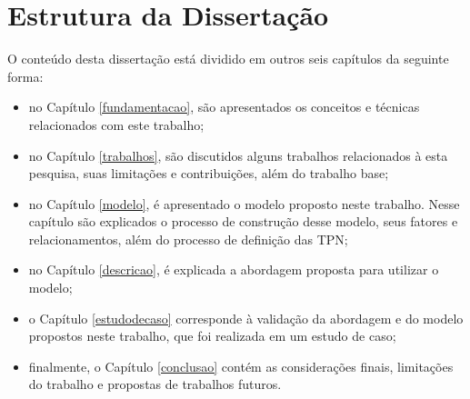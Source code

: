 \section{Estrutura da Dissertação}
\label{introducao:estrutura}

O conteúdo desta dissertação está dividido em outros seis capítulos da seguinte forma:

\begin{itemize}
  \item no Capítulo \ref{fundamentacao}, são apresentados os conceitos e técnicas relacionados com este trabalho;
  \item no Capítulo \ref{trabalhos}, são discutidos alguns trabalhos relacionados à esta pesquisa, suas limitações e contribuições, além do trabalho base;
  \item no Capítulo \ref{modelo}, é apresentado o modelo proposto neste trabalho. Nesse capítulo são explicados o processo de construção desse modelo, seus fatores e relacionamentos, além do processo de definição das TPN;
  \item no Capítulo \ref{descricao}, é explicada a abordagem proposta para utilizar o modelo;
  \item o Capítulo \ref{estudodecaso} corresponde à validação da abordagem e do modelo propostos neste trabalho, que foi realizada em um estudo de caso;
  \item finalmente, o Capítulo \ref{conclusao} contém as considerações finais, limitações do trabalho e propostas de trabalhos futuros.
\end{itemize}
